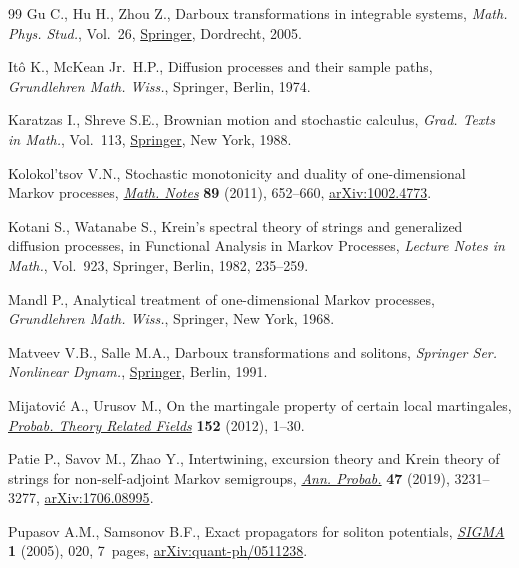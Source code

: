 \documentclass[pdftex]{sigma}
\numberwithin{equation}{section}
\theoremstyle{definition}
\def\i{{\textnormal i}}
\begin{document}
\begin{thebibliography}{99}
Gu C., Hu H., Zhou Z., Darboux transformations in integrable systems,
 \textit{Math. Phys. Stud.}, Vol.~26,
 \href{https://doi.org/10.1007/1-4020-3088-6}{Springer}, Dordrecht, 2005.

It\^o K., McKean Jr.~H.P., Diffusion processes and their sample paths,
 \textit{Grundlehren Math. Wiss.}, Springer, Berlin, 1974.

Karatzas I., Shreve S.E., Brownian motion and stochastic calculus,
 \textit{Grad. Texts in Math.}, Vol.~113,
 \href{https://doi.org/10.1007/978-1-4684-0302-2}{Springer}, New York, 1988.

Kolokol'tsov V.N., Stochastic monotonicity and duality of one-dimensional
 {M}arkov processes,
 \href{https://doi.org/10.1134/S0001434611050063}{\textit{Math. Notes}}
 \textbf{89} (2011), 652--660,
 \href{http://arxiv.org/abs/1002.4773}{arXiv:1002.4773}.

Kotani S., Watanabe S., Kre\u{\i}n's spectral theory of strings and generalized
 diffusion processes, in Functional {A}nalysis in {M}arkov {P}rocesses,
 \textit{Lecture Notes in Math.}, Vol.~923, Springer, Berlin, 1982, 235--259.

Mandl P., Analytical treatment of one-dimensional {M}arkov processes,
 \textit{Grundlehren Math. Wiss.}, Springer, New York, 1968.

Matveev V.B., Salle M.A., Darboux transformations and solitons, \textit{Springer Ser. Nonlinear Dynam.}, \href{https://doi.org/10.1007/978-3-662-00922-2}{Springer},
 Berlin, 1991.

Mijatovi\'c A., Urusov M., On the martingale property of certain local
 martingales, \href{https://doi.org/10.1007/s00440-010-0314-7}{\textit{Probab.
 Theory Related Fields}} \textbf{152} (2012), 1--30.

Patie P., Savov M., Zhao Y., Intertwining, excursion theory and {K}rein theory
 of strings for non-self-adjoint {M}arkov semigroups,
 \href{https://doi.org/10.1214/19-AOP1338}{\textit{Ann. Probab.}} \textbf{47}
 (2019), 3231--3277, \href{http://arxiv.org/abs/1706.08995}{arXiv:1706.08995}.

Pupasov A.M., Samsonov B.F., Exact propagators for soliton potentials,
 \href{https://doi.org/10.3842/SIGMA.2005.020}{\textit{SIGMA}} \textbf{1}
 (2005), 020, 7~pages,
 \href{http://arxiv.org/abs/quant-ph/0511238}{arXiv:quant-ph/0511238}.


\end{thebibliography}
\end{document}
